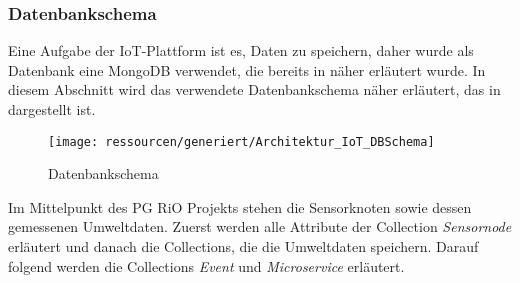 \subsubsection{Datenbankschema}
\label{sec:arch:iot:datenbankschema}
Eine Aufgabe der IoT-Plattform ist es, Daten zu speichern, daher wurde als Datenbank eine MongoDB verwendet, die bereits in  näher erläutert wurde. 
In diesem Abschnitt wird das verwendete Datenbankschema näher erläutert, das in  dargestellt ist. 
\begin{figure}[!htb]
	\centering
	\texttt{[image: ressourcen/generiert/Architektur\_IoT\_DBSchema]}
	\caption{Datenbankschema}
	\label{fig:Datenbankschema}
\end{figure}
\afterpage{\clearpage}

Im Mittelpunkt des PG RiO Projekts stehen die Sensorknoten sowie dessen gemessenen Umweltdaten. 
Zuerst werden alle Attribute der Collection \textit{Sensornode} erläutert und danach die Collections, die die Umweltdaten speichern.
Darauf folgend werden die Collections \textit{Event} und \textit{Microservice} erläutert.

